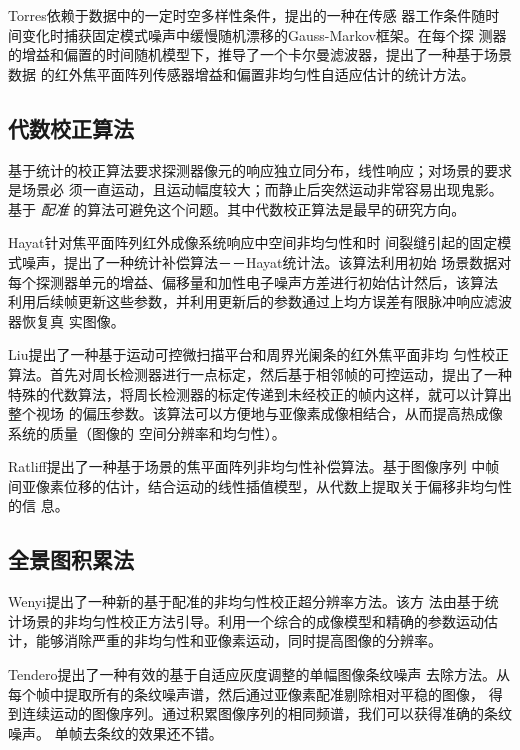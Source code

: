 \documentclass[../main]{subfiles}
\begin{document}
Torres\cite{Torres2003Kalman}依赖于数据中的一定时空多样性条件，提出的一种在传感
器工作条件随时间变化时捕获固定模式噪声中缓慢随机漂移的Gauss-Markov框架。在每个探
测器的增益和偏置的时间随机模型下，推导了一个卡尔曼滤波器，提出了一种基于场景数据
的红外焦平面阵列传感器增益和偏置非均匀性自适应估计的统计方法。

\subsection{代数校正算法}%
\label{sub:代数校正算法}

基于统计的校正算法要求探测器像元的响应独立同分布，线性响应；对场景的要求是场景必
须一直运动，且运动幅度较大；而静止后突然运动非常容易出现鬼影。基于 \emph{配准}
的算法可避免这个问题。其中代数校正算法是最早的研究方向。

Hayat\cite{Hayat1999Statistical}针对焦平面阵列红外成像系统响应中空间非均匀性和时
间裂缝引起的固定模式噪声，提出了一种统计补偿算法－－Hayat统计法。该算法利用初始
场景数据对每个探测器单元的增益、偏移量和加性电子噪声方差进行初始估计然后，该算法
利用后续帧更新这些参数，并利用更新后的参数通过上均方误差有限脉冲响应滤波器恢复真
实图像。

Liu\cite{Liu2011Non}提出了一种基于运动可控微扫描平台和周界光阑条的红外焦平面非均
匀性校正算法。首先对周长检测器进行一点标定，然后基于相邻帧的可控运动，提出了一种
特殊的代数算法，将周长检测器的标定传递到未经校正的帧内这样，就可以计算出整个视场
的偏压参数。该算法可以方便地与亚像素成像相结合，从而提高热成像系统的质量（图像的
空间分辨率和均匀性）。

Ratliff\cite{Ratliff2002An}提出了一种基于场景的焦平面阵列非均匀性补偿算法。基于图像序列
中帧间亚像素位移的估计，结合运动的线性插值模型，从代数上提取关于偏移非均匀性的信
息。

\subsection{全景图积累法}%
\label{sub:全景图积累法}

Wenyi\cite{Wenyi2008Scene}提出了一种新的基于配准的非均匀性校正超分辨率方法。该方
法由基于统计场景的非均匀性校正方法引导。利用一个综合的成像模型和精确的参数运动估
计，能够消除严重的非均匀性和亚像素运动，同时提高图像的分辨率。

Tendero\cite{Tendero2012Non}提出了一种有效的基于自适应灰度调整的单幅图像条纹噪声
去除方法。从每个帧中提取所有的条纹噪声谱，然后通过亚像素配准剔除相对平稳的图像，
得到连续运动的图像序列。通过积累图像序列的相同频谱，我们可以获得准确的条纹噪声。
单帧去条纹的效果还不错。
\end{document}
